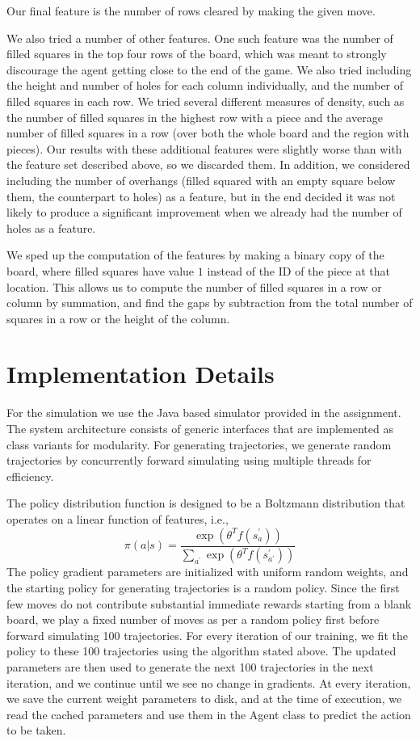 \documentclass[11pt]{article}
\begin{document}
Our final feature is the number of rows cleared by making the given move.

We also tried a number of other features.  One such feature was the number of filled squares in the top four rows of the board, which was meant to strongly discourage the agent getting close to the end of the game.  We also tried including the height and number of holes for each column individually, and the number of filled squares in each row.  We tried several different measures of density, such as the number of filled squares in the highest row with a piece and the average number of filled squares in a row (over both the whole board and the region with pieces).  Our results with these additional features were slightly worse than with the feature set described above, so we discarded them.  In addition, we considered including the number of overhangs (filled squared with an empty square below them, the counterpart to holes) as a feature, but in the end decided it was not likely to produce a significant improvement when we already had the number of holes as a feature.

We sped up the computation of the features by making a binary copy of the board, where filled squares have value $1$ instead of the ID of the piece at that location.  This allows us to compute the number of filled squares in a row or column by summation, and find the gaps by subtraction from the total number of squares in a row or the height of the column.


\section{Implementation Details}
For the simulation we use the Java based simulator provided in the assignment. The system architecture consists of generic interfaces that are implemented as class variants for modularity. For generating trajectories, we generate random trajectories by concurrently forward simulating using multiple threads for efficiency.

The policy distribution function is designed to be a Boltzmann distribution that operates on a linear function of features, i.e.,
\[ \pi(a|s)=\frac{\exp\left(\theta^{T}f\left(s_{a}^{\prime}\right)\right)}{\underset{a^{\prime}}{\sum}\exp\left(\theta^{T}f\left(s_{a^{\prime}}^{\prime}\right)\right)} \]
 The policy gradient parameters are initialized with uniform random weights, and the starting policy for generating trajectories is a random policy. Since the first few moves do not contribute substantial immediate rewards starting from a blank board, we play a fixed number of moves as per a random policy first before forward simulating 100 trajectories. For every iteration of our training, we fit the policy to these 100 trajectories using the algorithm stated above. The updated parameters are then used to generate the next 100 trajectories in the next iteration, and we continue until we see no change in gradients. At every iteration, we save the current weight parameters to disk, and at the time of execution, we read the cached parameters and use them in the Agent class to predict the action to be taken.
 
\end{document}
